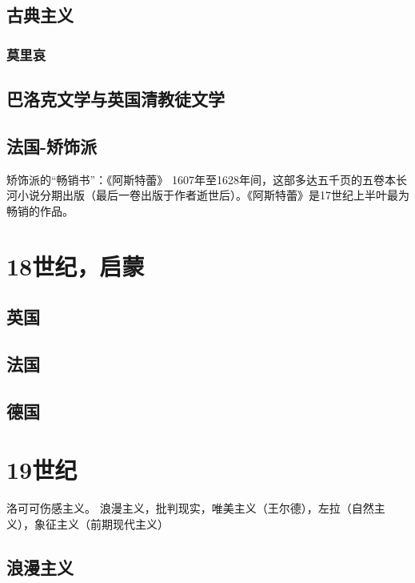\documentclass[UTF8]{../RepresentationUniverse}
\begin{document}
\section{古典主义}

\subsection{莫里哀}

\section{巴洛克文学与英国清教徒文学}


\section{法国-矫饰派}


矫饰派的“畅销书”：《阿斯特蕾》
1607年至1628年间，这部多达五千页的五卷本长河小说分期出版（最后一卷出版于作者逝世后）。《阿斯特蕾》是17世纪上半叶最为畅销的作品。


\chapter{18世纪，启蒙}


\section{英国}

\section{法国}

\section{德国}



\chapter{19世纪}

洛可可伤感主义。
浪漫主义，批判现实，唯美主义（王尔德），左拉（自然主义），象征主义（前期现代主义）


\section{浪漫主义}
\end{document}
